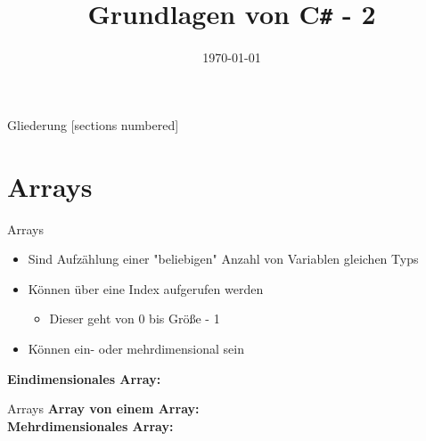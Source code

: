 



\title{Grundlagen von C\texttt{\#} - 2}
\date{\today}




\maketitle

\begin{frame}{Gliederung}
	[sections numbered]
	\tableofcontents
\end{frame}

\section{Arrays}
\begin{frame}{Arrays}
	\begin{itemize}
		\item Sind Aufzählung einer "beliebigen" Anzahl von Variablen gleichen Typs
		\item Können über eine Index aufgerufen werden
		\begin{itemize}
			\item Dieser geht von 0 bis Größe - 1
		\end{itemize}
		\item Können ein- oder mehrdimensional sein
	\end{itemize}
	\textbf{Eindimensionales Array:}\\
		
\end{frame}

\begin{frame}{Arrays}
	\textbf{Array von einem Array:}\\
	
	\textbf{Mehrdimensionales Array:}\\
		
\end{frame}

